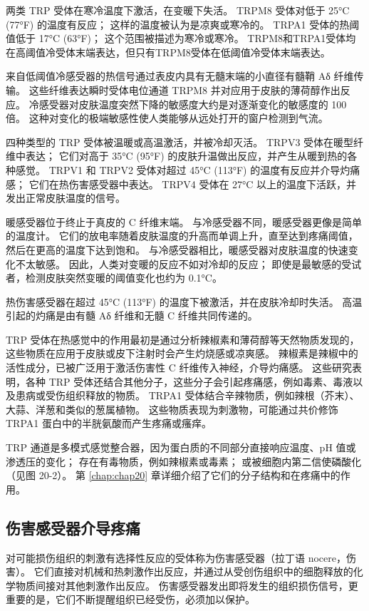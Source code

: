 两类 TRP 受体在寒冷温度下激活，在变暖下失活。 
TRPM8 受体对低于 25°C (77°F) 的温度有反应； 这样的温度被认为是凉爽或寒冷的。 
TRPA1 受体的热阈值低于 17°C (63°F)； 这个范围被描述为寒冷或寒冷。 
TRPM8和TRPA1受体均在高阈值冷受体末端表达，但只有TRPM8受体在低阈值冷受体末端表达。


来自低阈值冷感受器的热信号通过表皮内具有无髓末端的小直径有髓鞘 Aδ 纤维传输。 
这些纤维表达瞬时受体电位通道 TRPM8 并对应用于皮肤的薄荷醇作出反应。 
冷感受器对皮肤温度突然下降的敏感度大约是对逐渐变化的敏感度的 100 倍。 
这种对变化的极端敏感性使人类能够从远处打开的窗户检测到气流。


四种类型的 TRP 受体被温暖或高温激活，并被冷却灭活。 
TRPV3 受体在暖型纤维中表达； 它们对高于 35°C (95°F) 的皮肤升温做出反应，并产生从暖到热的各种感觉。 
TRPV1 和 TRPV2 受体对超过 45°C (113°F) 的温度有反应并介导灼痛感； 它们在热伤害感受器中表达。 
TRPV4 受体在 27°C 以上的温度下活跃，并发出正常皮肤温度的信号。


暖感受器位于终止于真皮的 C 纤维末端。 
与冷感受器不同，暖感受器更像是简单的温度计。 
它们的放电率随着皮肤温度的升高而单调上升，直至达到疼痛阈值，然后在更高的温度下达到饱和。 
与冷感受器相比，暖感受器对皮肤温度的快速变化不太敏感。 
因此，人类对变暖的反应不如对冷却的反应； 即使是最敏感的受试者，检测皮肤突然变暖的阈值变化也约为 0.1°C。


热伤害感受器在超过 45°C (113°F) 的温度下被激活，并在皮肤冷却时失活。 高温引起的灼痛是由有髓 Aδ 纤维和无髓 C 纤维共同传递的。


TRP 受体在热感觉中的作用最初是通过分析辣椒素和薄荷醇等天然物质发现的，这些物质在应用于皮肤或皮下注射时会产生灼烧感或凉爽感。 
辣椒素是辣椒中的活性成分，已被广泛用于激活伤害性 C 纤维传入神经，介导灼痛感。 
这些研究表明，各种 TRP 受体还结合其他分子，这些分子会引起疼痛感，例如毒素、毒液以及患病或受伤组织释放的物质。 
TRPA1 受体结合辛辣物质，例如辣根（芥末）、大蒜、洋葱和类似的葱属植物。 
这些物质表现为刺激物，可能通过共价修饰 TRPA1 蛋白中的半胱氨酸而产生疼痛或瘙痒。


TRP 通道是多模式感觉整合器，因为蛋白质的不同部分直接响应温度、pH 值或渗透压的变化； 
存在有毒物质，例如辣椒素或毒素； 
或被细胞内第二信使磷酸化（见图 20-2）。 
第 \ref{chap:chap20} 章详细介绍了它们的分子结构和在疼痛中的作用。


\subsection{伤害感受器介导疼痛}
对可能损伤组织的刺激有选择性反应的受体称为伤害感受器（拉丁语 nocere，伤害）。 
它们直接对机械和热刺激作出反应，并通过从受创伤组织中的细胞释放的化学物质间接对其他刺激作出反应。 
伤害感受器发出即将发生的组织损伤信号，更重要的是，它们不断提醒组织已经受伤，必须加以保护。


